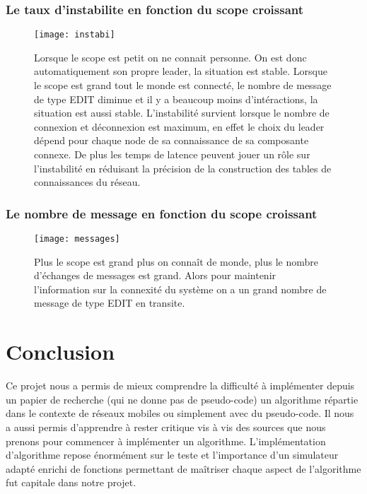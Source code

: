 \documentclass[11pt,a4paper,sans]{report}
\begin{document}
	\subsection{Le taux d'instabilite en fonction du scope croissant}
	\begin{figure}[H]
		\centering
		\texttt{[image: instabi]}
		\caption{ Lorsque le scope est petit on ne connait personne. On est donc automatiquement son propre leader, la situation est stable. Lorsque le scope est grand tout le monde est connecté, le nombre de message de type EDIT diminue et il y a beaucoup moins d'intéractions, la situation est aussi stable. L'instabilité survient lorsque le nombre de connexion et déconnexion est maximum, en effet le choix du leader dépend pour chaque node de sa connaissance de sa composante connexe. De plus les temps de latence peuvent jouer un rôle sur l'instabilité en réduisant la précision de la construction des tables de connaissances du réseau.
		}
	\end{figure}


	\subsection{Le nombre de message en fonction du scope croissant}
	\begin{figure}[H]
		\centering
		\texttt{[image: messages]}
		\caption{Plus le scope est grand plus on connaît de monde, plus le nombre d'échanges de messages est grand. Alors pour maintenir l'information sur la connexité du système on a un grand nombre de message de type EDIT en transite. 
		}
	\end{figure}
	

	\newpage
	\chapter{Conclusion}
	Ce projet nous a permis de mieux comprendre la difficulté à implémenter depuis un papier de recherche (qui ne donne pas de pseudo-code) un algorithme répartie dans le contexte de réseaux mobiles ou simplement avec du pseudo-code. Il nous a aussi permis d'apprendre à rester critique vis à vis des sources que nous prenons pour commencer à implémenter un algorithme. 
	L'implémentation d'algorithme repose énormément sur le teste et l'importance d'un simulateur adapté enrichi de fonctions permettant de maîtriser chaque aspect de l'algorithme fut capitale dans notre projet.  
\end{document}
